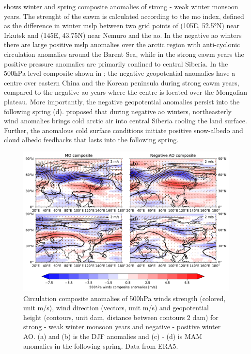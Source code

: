  shows winter and spring composite anomalies of strong - weak winter monsoon years. The strenght of the \acrshort{eawm} is calculated according to the  \acrshort{mo} index, defined as the difference in winter \acrfull{mslp} between two grid points of (105\degree E, 52.5°N) near Irkutsk and (145\degree E, 43.75\degree N) near Nemuro and the \acrshort{ao}. 
In the negative \acrshort{ao} winters there are large positive \acrshort{mslp} anomalies over the arctic region with anti-cyclonic circulation anomalies around the Barent Sea, while in the strong \acrshort{eawm} years the positive pressure anomalies are primarily confined to central Siberia. In the 500hPa level composite shown in ; the negative geopotential anomalies have a centre over eastern China and the Korean peninsula during strong \acrshort{eawm} years, compared to the negative \acrshort{ao} years where the centre is located over the Mongolian plateau. More importantly, the negative geopotential anomalies persist into the following spring  (d). \textcite{liu2018influence} proposed that during negative \acrshort{ao} winters, northeasterly wind anomalies brings cold arctic air into central Siberia cooling the land surface. Further, the anomalous cold surface conditions initiate positive snow-albedo and cloud albedo feedbacks that lasts into the following spring.  

\begin{figure}[htbp]
    \centering
    \includegraphics[width=\textwidth]{texfiles/figs/winter_MO_AO_composite_500h.pdf}
    \caption{Circulation composite anomalies of 500hPa winds strength (colored, unit m/s), wind direction (vectors, unit m/s) and geopotential height (contours, unit dam, distance between contours 2 dam) for strong - weak winter monsoon years and negative - positive winter AO. (a) and (b) is the DJF anomalies and (c) - (d) is MAM anomalies in the following spring. Data from ERA5.}
    \label{fig:mo_ao_composite_500hPa}
\end{figure}

